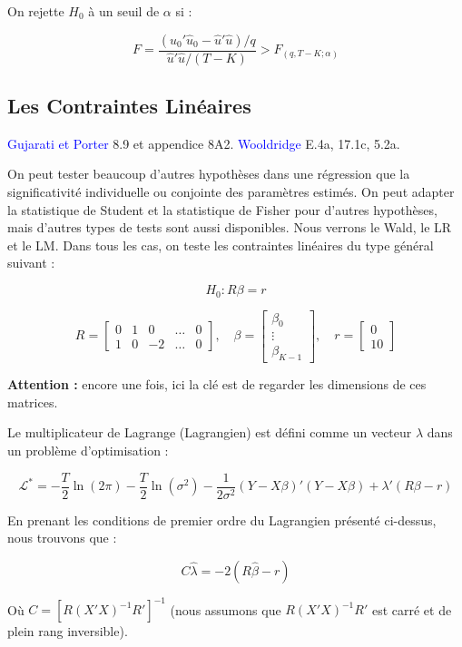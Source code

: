 \documentclass[14pt]{extarticle} %
\theoremstyle{definition}
\theoremstyle{plain}
\newcommand{\livre}[1]{\textcolor{blue}{#1}}
\begin{document}
On rejette $H_0$ à un seuil de $\alpha$ si :

\[
F = \frac{(\hat{u}_0'\hat{u}_0 - \hat{u}'\hat{u}) / q}{\hat{u}'\hat{u} / (T - K)} > F_{(q, T - K; \alpha)}
\]

\subsection{Les Contraintes Linéaires}

\livre{Gujarati et Porter} 8.9 et appendice 8A2. \livre{Wooldridge} E.4a, 17.1c, 5.2a.

On peut tester beaucoup d’autres hypothèses dans une régression que la significativité individuelle ou conjointe des paramètres estimés. On peut adapter la statistique de Student et la statistique de Fisher pour d’autres hypothèses, mais d’autres types de tests sont aussi disponibles. Nous verrons le Wald, le LR et le LM. Dans tous les cas, on teste les contraintes linéaires du type général suivant :

\[
H_0 : R\beta = r
\]

\[
R = \begin{bmatrix}
0 & 1 & 0 & \dots & 0 \\
1 & 0 & -2 & \dots & 0
\end{bmatrix}, \quad
\beta = \begin{bmatrix}
\beta_0 \\
\vdots \\
\beta_{K-1}
\end{bmatrix}, \quad
r = \begin{bmatrix}
0 \\
10
\end{bmatrix}
\]

\textbf{Attention :} encore une fois, ici la clé est de regarder les dimensions de ces matrices.

Le multiplicateur de Lagrange (Lagrangien) est défini comme un vecteur $\lambda$ dans un problème d’optimisation :

\[
\mathcal{L}^* = -\frac{T}{2} \ln(2\pi) - \frac{T}{2} \ln(\sigma^2) - \frac{1}{2\sigma^2} (Y - X\beta)'(Y - X\beta) + \lambda'(R\beta - r)
\]

En prenant les conditions de premier ordre du Lagrangien présenté ci-dessus, nous trouvons que :

\[
C\hat{\lambda} = -2 (R\hat{\beta} - r)
\]

Où $C = [R(X'X)^{-1}R']^{-1}$ (nous assumons que $R(X'X)^{-1}R'$ est carré et de plein rang inversible).
\end{document}
